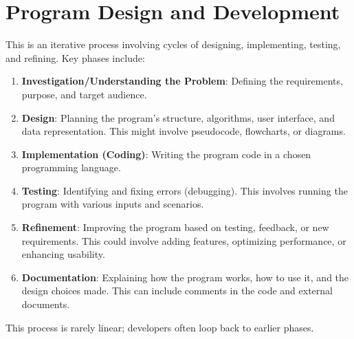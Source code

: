 \documentclass[11pt,oneside]{book}
\begin{document}
\section{Program Design and Development}
\label{sec:program_design_development}
This is an iterative process involving cycles of designing, implementing, testing, and refining. Key phases include:
\begin{enumerate}[label=\arabic*.]
    \item \textbf{Investigation/Understanding the Problem}: Defining the requirements, purpose, and target audience.
    \item \textbf{Design}: Planning the program's structure, algorithms, user interface, and data representation. This might involve pseudocode, flowcharts, or diagrams.
    \item \textbf{Implementation (Coding)}: Writing the program code in a chosen programming language.
    \item \textbf{Testing}: Identifying and fixing errors (debugging). This involves running the program with various inputs and scenarios.
    \item \textbf{Refinement}: Improving the program based on testing, feedback, or new requirements. This could involve adding features, optimizing performance, or enhancing usability.
    \item \textbf{Documentation}: Explaining how the program works, how to use it, and the design choices made. This can include comments in the code and external documents.
\end{enumerate}
This process is rarely linear; developers often loop back to earlier phases.
\end{document}
